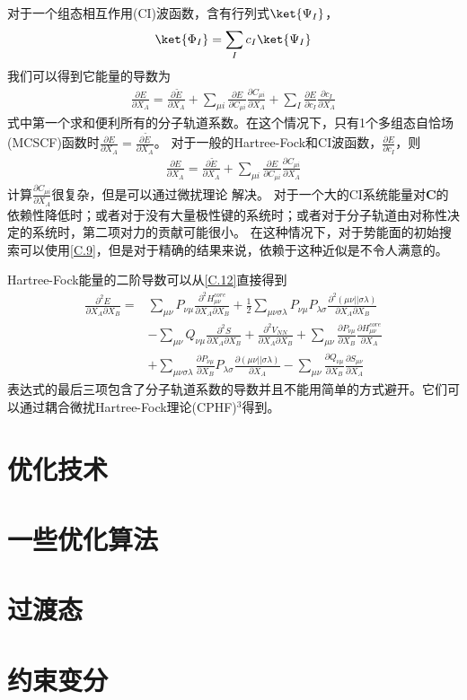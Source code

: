 对于一个组态相互作用(CI)波函数，含有行列式$\ket{\Psi _I}$，
\begin{align}
	\nonumber
    \ket{\Phi  _I}=\sum_{I}c_I\ket{\Psi _I}
\end{align}
我们可以得到它能量的导数为
\begin{align}
	\label{C.16}
	\frac{\partial E}{\partial X_A}=\frac{\partial {\tilde{E} }}{\partial X_A}
	+\sum_{\mu i}\frac{\partial E}{\partial C_{\mu i}}\frac{\partial C_{\mu i}}{\partial X_A}
	+\sum_{I}\frac{\partial E}{\partial c_{I}}\frac{\partial c_{I}}{\partial X_A}
\end{align}
式中第一个求和便利所有的分子轨道系数。在这个情况下，只有1个多组态自恰场(MCSCF)函数时$\frac{\partial E}{\partial X_A}=\frac{\partial {\tilde{E} }}{\partial X_A}$。
对于一般的Hartree-Fock和CI波函数，$\frac{\partial E}{\partial c_{I}}$，则
\begin{align}
	\label{C.17}
	\frac{\partial E}{\partial X_A}=\frac{\partial {\tilde{E} }}{\partial X_A}
	+\sum_{\mu i}\frac{\partial E}{\partial C_{\mu i}}\frac{\partial C_{\mu i}}{\partial X_A}
\end{align}
计算$\frac{\partial C_{\mu i}}{\partial X_A}$很复杂，但是可以通过微扰理论
解决。
对于一个大的CI系统能量对$\mathbf{C}$的依赖性降低时；或者对于没有大量极性键的系统时；或者对于分子轨道由对称性决定的系统时，第二项对力的贡献可能很小。
在这种情况下，对于势能面的初始搜索可以使用\autoref{C.9}，但是对于精确的结果来说，依赖于这种近似是不令人满意的。

Hartree-Fock能量的二阶导数可以从\autoref{C.12}直接得到
\begin{align}
	\nonumber
	\frac{\partial^2 E}{\partial X_A\partial X_B}=&\sum_{ \mu \nu }P_{\nu \mu}\frac{\partial^2 H_{\mu \nu}^{core}}{\partial X_A\partial X_B}
		+\frac{1}{2}\sum_{\mu \nu \sigma \lambda }P_{ \nu \mu }P_{\lambda \sigma}\frac{\partial^2 (\mu \nu|| \sigma\lambda)}{\partial X_A\partial X_B}
		\\ \nonumber &
		-\sum_{\mu \nu }Q_{ \nu \mu}\frac{\partial^2 S}{\partial X_A\partial X_B}
		+\frac{\partial^2 V_{NN}}{\partial X_A\partial X_B}
		+\sum_{\mu \nu }\frac{\partial P_{ \nu\mu}}{\partial X_B}\frac{\partial H_{\mu \nu}^{core}}{\partial X_A}
		\\ \nonumber &
		+\sum_{\mu \nu \sigma \lambda }\frac{\partial P_{ \nu \mu }}{\partial X_B}P_{\lambda \sigma}\frac{\partial (\mu \nu|| \sigma\lambda)}{\partial X_A}
		-\sum_{\mu \nu }\frac{\partial Q_{ \nu\mu}}{\partial X_B}\frac{\partial S_{\mu \nu}}{\partial X_A}
	\end{align}
表达式的最后三项包含了分子轨道系数的导数并且不能用简单的方式避开。它们可以通过耦合微扰Hartree-Fock理论(CPHF)$^3$得到。
\section{优化技术}
\section{一些优化算法}
\section{过渡态}
\section{约束变分}
\newpage
\theendnotes
{}